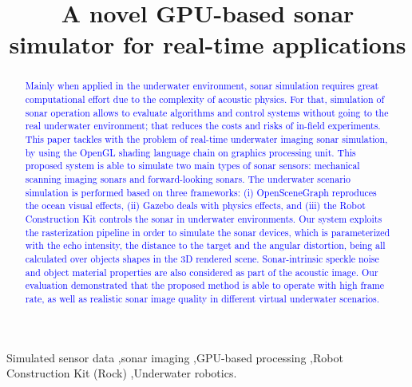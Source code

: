 \documentclass[final,5p,times]{elsarticle}
\begin{document}
\begin{frontmatter}


\title{A novel GPU-based sonar simulator for real-time applications}



\begin{abstract}

\textcolor{blue}{Mainly when applied in the underwater environment, sonar simulation requires great computational effort due to the complexity of acoustic physics. For that, simulation of sonar operation allows to evaluate algorithms and control systems without going to the real underwater environment; that reduces the costs and risks of in-field experiments. This paper tackles with the problem of real-time underwater imaging sonar simulation, by using the OpenGL shading language chain on graphics processing unit. This proposed system is able to simulate two main types of sonar sensors: mechanical scanning imaging sonars and forward-looking sonars. The underwater scenario simulation is performed based on three frameworks: (i) OpenSceneGraph reproduces the ocean visual effects, (ii) Gazebo deals with physics effects, and (iii) the Robot Construction Kit controls the sonar in underwater environments. Our system exploits the rasterization pipeline in order to simulate the sonar devices, which is parameterized with the echo intensity, the distance to the target and the angular distortion, being all calculated over objects shapes in the 3D rendered scene. Sonar-intrinsic speckle noise and object material properties are also considered as part of the acoustic image. Our evaluation demonstrated that the proposed method is able to operate with high frame rate, as well as realistic sonar image quality in different virtual underwater scenarios.}

\end{abstract}

\begin{keyword}
Simulated sensor data
\sep sonar imaging
\sep GPU-based processing
\sep Robot Construction Kit (Rock)
\sep Underwater robotics.

\end{keyword}

\end{frontmatter}
\end{document}
